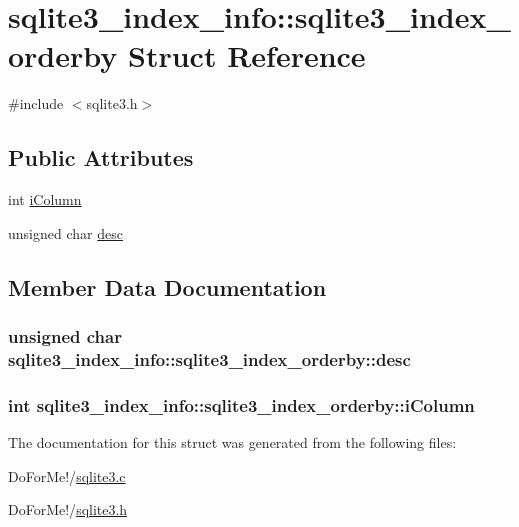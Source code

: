 \hypertarget{structsqlite3__index__info_1_1sqlite3__index__orderby}{\section{sqlite3\-\_\-index\-\_\-info\-:\-:sqlite3\-\_\-index\-\_\-orderby Struct Reference}
\label{structsqlite3__index__info_1_1sqlite3__index__orderby}
}


{\ttfamily \#include $<$sqlite3.\-h$>$}

\subsection*{Public Attributes}
\begin{DoxyCompactItemize}
\item 
int \hyperlink{structsqlite3__index__info_1_1sqlite3__index__orderby_a266396085bfda9acef3f13eaa170cd2f}{i\-Column}
\item 
unsigned char \hyperlink{structsqlite3__index__info_1_1sqlite3__index__orderby_a0586d1b5d36221af96aeba8cfc56e9c6}{desc}
\end{DoxyCompactItemize}


\subsection{Member Data Documentation}
\hypertarget{structsqlite3__index__info_1_1sqlite3__index__orderby_a0586d1b5d36221af96aeba8cfc56e9c6}{
\subsubsection[{desc}]{\setlength{\rightskip}{0pt plus 5cm}unsigned char sqlite3\-\_\-index\-\_\-info\-::sqlite3\-\_\-index\-\_\-orderby\-::desc}}\label{structsqlite3__index__info_1_1sqlite3__index__orderby_a0586d1b5d36221af96aeba8cfc56e9c6}
\hypertarget{structsqlite3__index__info_1_1sqlite3__index__orderby_a266396085bfda9acef3f13eaa170cd2f}{
\subsubsection[{i\-Column}]{\setlength{\rightskip}{0pt plus 5cm}int sqlite3\-\_\-index\-\_\-info\-::sqlite3\-\_\-index\-\_\-orderby\-::i\-Column}}\label{structsqlite3__index__info_1_1sqlite3__index__orderby_a266396085bfda9acef3f13eaa170cd2f}


The documentation for this struct was generated from the following files\-:\begin{DoxyCompactItemize}
\item 
Do\-For\-Me!/\hyperlink{sqlite3_8c}{sqlite3.\-c}\item 
Do\-For\-Me!/\hyperlink{sqlite3_8h}{sqlite3.\-h}\end{DoxyCompactItemize}
